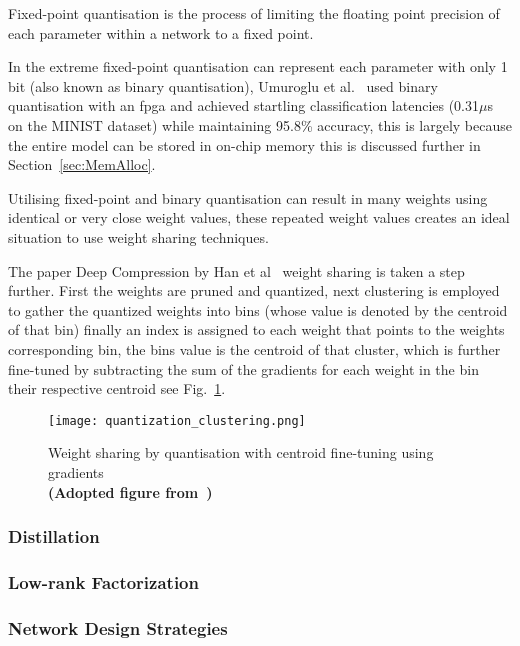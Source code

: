 \documentclass[../../D1.tex]{subfiles}
\begin{document}
Fixed-point quantisation is the process of limiting the floating point precision of each parameter within a network to a fixed point. 

In the extreme fixed-point quantisation can represent each parameter with only 1 bit (also known as binary quantisation), Umuroglu et al.~\autocite{umurogluFINNFrameworkFast2017} used binary quantisation with an \acrshort{fpga} and achieved startling classification latencies (0.31$\mu$s on the MINIST dataset) while maintaining 95.8\% accuracy, this is largely because the entire model can be stored in on-chip memory this is discussed further in Section~\ref{sec:MemAlloc}.


Utilising fixed-point and binary quantisation can result in many weights using identical or very close weight values, these repeated weight values creates an ideal situation to use weight sharing techniques.

The paper Deep Compression by Han et al~\autocite{hanDeepCompressionCompressing2016} weight sharing is taken a step further.
First the weights are pruned and quantized, next clustering is employed to gather the quantized weights into bins (whose value is denoted by the centroid of that bin) finally an index is assigned to each weight that points to the weights corresponding bin, the bins value is the centroid of that cluster, which is further fine-tuned by subtracting the sum of the gradients for each weight in the bin their respective centroid see Fig.~\ref{fig:QuantisationClust}.  

\begin{figure}[H]
    \begin{center}
        \texttt{[image: quantization\_clustering.png]} 
    \end{center}
    
    \caption{Weight sharing by quantisation with centroid fine-tuning using gradients\\ \textbf{(Adopted figure from~\autocite{hanDeepCompressionCompressing2016})}}
    \label{fig:QuantisationClust}   
\end{figure}



\subsubsection{Distillation}\label{sec:Distillation}

\subsubsection{Low-rank Factorization}\label{sec:lrFactorization}

\subsubsection{Network Design Strategies}\label{sec:NetworkDesignStrat}
\end{document}
